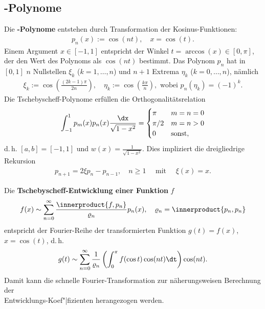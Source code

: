 \pagebreak

\subsection{%
    -Polynome%
}

Die \textbf{-Polynome} entstehen durch Transformation
der Kosinus-Funktionen:
\begin{align*}
    p_n(x) := \cos(nt), \quad
    x = \cos(t).
\end{align*}
Einem Argument $x \in [-1, 1]$ entspricht der Winkel
$t = \arccos(x) \in [0,\pi]$, der den Wert des Polynoms als $\cos(nt)$
bestimmt.
Das Polynom $p_n$ hat in $[0,1]$ $n$ Nullstellen $\xi_k$ ($k = 1, \dotsc, n$)
und $n + 1$ Extrema $\eta_k$ ($k = 0, \dotsc, n$), nämlich
\begin{align*}
    \xi_k := \cos\left(\frac{(2k - 1)\pi}{2n}\right), \quad
    \eta_k := \cos\left(\frac{k\pi}{n}\right), \text{ wobei }
    p_n(\eta_k) = (-1)^k.
\end{align*}
Die Tschebyscheff-Polynome erfüllen die Orthogonalitätsrelation
\begin{align*}
    \int_{-1}^1 p_m(x) p_n(x) \frac{\dx}{\sqrt{1 - x^2}} =
    \begin{cases}\pi & m = n = 0 \\ \pi/2 & m = n > 0 \\ 0 & \text{sonst},
    \end{cases}
\end{align*}
d.\,h. $[a,b] = [-1, 1]$ und $w(x) = \frac{1}{\sqrt{1 - x^2}}$.
Dies impliziert die dreigliedrige Rekursion
\begin{align*}
    p_{n+1} = 2 \xi p_n - p_{n-1}, \quad n \ge 1 \quad \text{ mit } \quad
    \xi(x) = x.
\end{align*}

\linie

Die \textbf{Tschebyscheff-Entwicklung einer Funktion} $f$
\begin{align*}
    f(x) \sim \sum_{n=0}^\infty \frac{\innerproduct{f, p_n}}{\varrho_n} p_n(x),
    \quad \varrho_n = \innerproduct{p_n, p_n}
\end{align*}
entspricht der Fourier-Reihe der transformierten Funktion $g(t) = f(x)$,
$x = \cos(t)$, d.\,h.
\begin{align*}
    g(t) \sim \sum_{n=0}^\infty \frac{1}{\varrho_n}
    \left(\int_0^\pi f(\cos t) \cos(nt) \dt\right) \cos(nt).
\end{align*}
Damit kann die schnelle Fourier-Transformation zur näherungsweisen Berechnung
der \\
Entwicklungs-Koef"|fizienten herangezogen werden.

